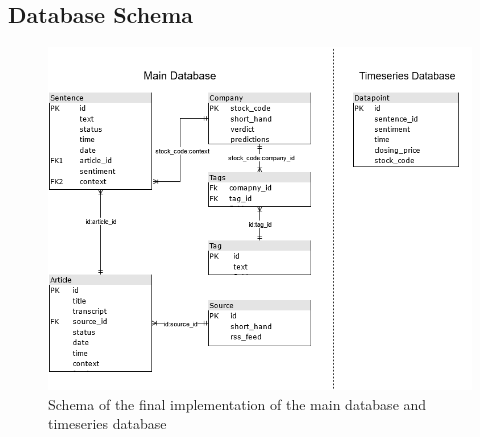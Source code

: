 \documentclass{l4proj}
\begin{document}
\begin{appendices}









\chapter{Database Schema}

\begin{figure}[h]
    \centering
    \includegraphics[width=\linewidth]{images/upload/schema.png}
    \caption{Schema of the final implementation of the main database and timeseries database}
    \label{fig:AP:schema}
\end{figure}



\end{appendices}
\end{document}
